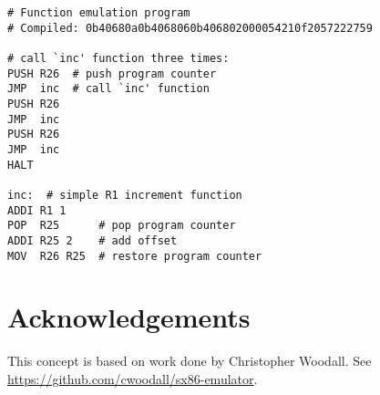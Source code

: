 \documentclass[12pt]{scrartcl}
\begin{document}
\begin{lstlisting}
# Function emulation program
# Compiled: 0b40680a0b4068060b406802000054210f2057222759

# call `inc' function three times:
PUSH R26  # push program counter
JMP  inc  # call `inc' function
PUSH R26
JMP  inc
PUSH R26
JMP  inc
HALT

inc:  # simple R1 increment function
ADDI R1 1
POP  R25      # pop program counter
ADDI R25 2    # add offset
MOV  R26 R25  # restore program counter
\end{lstlisting}




\section{Acknowledgements}

This concept is based on work done by Christopher Woodall. See \url{https://github.com/cwoodall/sx86-emulator}.
\end{document}
